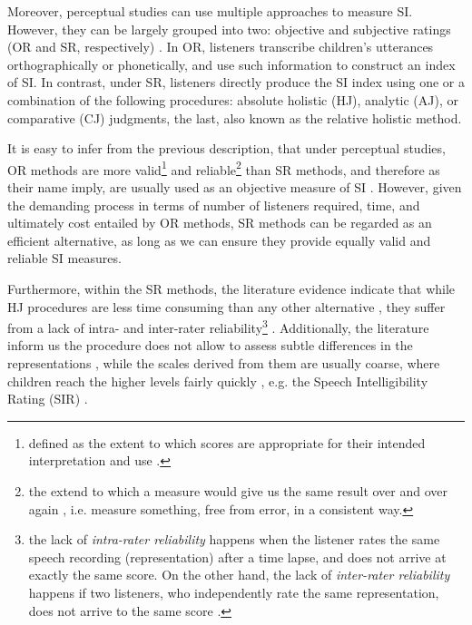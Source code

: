 Moreover, perceptual studies can use multiple approaches to measure SI. However, they can be largely grouped into two: objective and subjective ratings (OR and SR, respectively) \citep{Hustad_et_al_2020}. In OR, listeners transcribe children's utterances orthographically or phonetically, and use such information to construct an index of SI. In contrast, under SR, listeners directly produce the SI index using one or a combination of the following procedures: absolute holistic (HJ), analytic (AJ), or comparative (CJ) judgments, the last, also known as the relative holistic method. 

It is easy to infer from the previous description, that under perceptual studies, OR methods are more valid\footnote{defined as the extent to which scores are appropriate for their intended interpretation and use \citep{Lesterhuis_2018, Trochim_2022}.} and reliable\footnote{the extend to which a measure would give us the same result over and over again \citep{Trochim_2022}, i.e. measure something, free from error, in a consistent way.} than SR methods, and therefore as their name imply, are usually used as an objective measure of SI \citep{Boonen_et_al_2021, Faes_et_al_2021}. However, given the demanding process in terms of number of listeners required, time, and ultimately cost entailed by OR methods, SR methods can be regarded as an efficient alternative, as long as we can ensure they provide equally valid and reliable SI measures.

Furthermore, within the SR methods, the literature evidence indicate that while HJ procedures are less time consuming than any other alternative \citep{Boonen_et_al_2021}, they suffer from a lack of intra- and inter-rater reliability\footnote{the lack of \textit{intra-rater reliability} happens when the listener rates the same speech recording (representation) after a time lapse, and does not arrive at exactly the same score. On the other hand, the lack of \textit{inter-rater reliability} happens if two listeners, who independently rate the same representation, does not arrive to the same score \citep{Trochim_2022}.} \citep{McLeod_et_al_2012, Johannisson_et_al_2014, Hustad_et_al_2020, Boonen_et_al_2021}. Additionally, the literature inform us the procedure does not allow to assess subtle differences in the representations \citep{Boonen_et_al_2021}, while the scales derived from them are usually coarse, where children reach the higher levels fairly quickly \citep{DeRaeve_2010}, e.g. the Speech Intelligibility Rating (SIR) \citep{Cox_et_al_1989, McDaniel_et_al_1992}.

